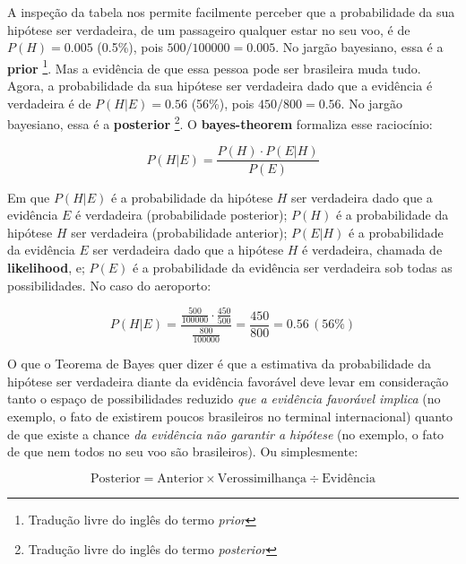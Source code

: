 \documentclass[./main.tex]{subfiles}
\begin{document}
A inspeção da tabela nos permite facilmente perceber que a probabilidade da sua hipótese ser verdadeira, de um passageiro qualquer estar no seu voo, é de $P(H) = 0.005$ (0.5\%), pois $500 / 100000 = 0.005$. No jargão bayesiano, essa é a \textbf{\gls{prior}} \footnote{Tradução livre do inglês do termo \textit{prior}}. Mas a evidência de que essa pessoa pode ser brasileira muda tudo. Agora, a probabilidade da sua hipótese ser verdadeira dado que a evidência é verdadeira é de $P(H | E) = 0.56$ (56\%), pois $450 / 800 = 0.56$. No jargão bayesiano, essa é a \textbf{\gls{posterior}} \footnote{Tradução livre do inglês do termo \textit{posterior}}. O \textbf{\gls{bayes-theorem}} formaliza esse raciocínio:
\begin{linenomath*}
\begin{equation}
\label{eq:bayes}
    P(H | E) = \frac{P(H) \cdot P(E | H)}{P(E)}
\end{equation}
\end{linenomath*}
Em que $P(H | E)$ é a probabilidade da hipótese $H$ ser verdadeira dado que a evidência $E$ é verdadeira (probabilidade posterior); $P(H)$ é a probabilidade da hipótese $H$ ser verdadeira (probabilidade anterior);  $P(E | H)$ é a probabilidade da evidência $E$ ser verdadeira dado que a hipótese $H$ é verdadeira, chamada de \textbf{\gls{likelihood}}, e; $P(E)$ é a probabilidade da evidência ser verdadeira sob todas as possibilidades. No caso do aeroporto:
\begin{linenomath*}
\begin{equation*}
    P(H | E) = \frac{\frac{500}{100000} \cdot \frac{450}{500}}{\frac{800}{100000}} = \frac{450}{800} = 0.56\,(56\%)
\end{equation*}
\end{linenomath*}
O que o Teorema de Bayes quer dizer é que a estimativa da probabilidade da hipótese ser verdadeira diante da evidência favorável deve levar em consideração tanto o espaço de possibilidades reduzido \textit{que a evidência favorável implica} (no exemplo, o fato de existirem poucos brasileiros no terminal internacional) quanto de que existe a chance \textit{da evidência não garantir a hipótese} (no exemplo, o fato de que nem todos no seu voo são brasileiros).  Ou simplesmente:
\begin{linenomath*}
\begin{equation*}
    \text{Posterior} = \text{Anterior} \times \text{Verossimilhança} \div \text{Evidência}
\end{equation*}
\end{linenomath*}
\end{document}
